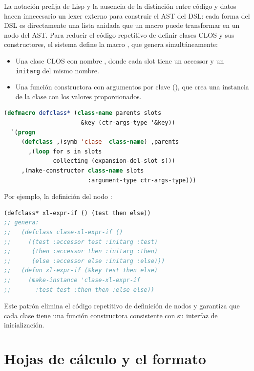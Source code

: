 La notación prefija de Lisp y la ausencia de la distinción entre código y
datos hacen innecesario un lexer externo para construir el AST del DSL: cada
forma del DSL es directamente una lista anidada que un macro puede transformar
en un nodo del AST.  Para reducir el código repetitivo de definir clases CLOS
y sus constructores, el sistema define la macro , que genera
simultáneamente:

\begin{itemize}
  \item Una clase CLOS con nombre , donde
    cada slot tiene un accessor y un \texttt{initarg} del mismo nombre.
  \item Una función constructora  con argumentos
    por clave (), que crea una instancia de la clase con los
    valores proporcionados.
\end{itemize}

\begin{lstlisting}[language=CommonLisp,
  caption={Implementaci\'on de defclass*.}]
(defmacro defclass* (class-name parents slots
                      &key (ctr-args-type '&key))
  `(progn
     (defclass ,(symb 'clase- class-name) ,parents
       ,(loop for s in slots
              collecting (expansion-del-slot s)))
     ,(make-constructor class-name slots
                        :argument-type ctr-args-type)))
\end{lstlisting}

Por ejemplo, la definición del nodo :

\begin{lstlisting}[language=CommonLisp,
  caption={Ejemplo de uso de defclass*.}]
(defclass* xl-expr-if () (test then else))
;; genera:
;;   (defclass clase-xl-expr-if ()
;;     ((test :accessor test :initarg :test)
;;      (then :accessor then :initarg :then)
;;      (else :accessor else :initarg :else)))
;;   (defun xl-expr-if (&key test then else)
;;     (make-instance 'clase-xl-expr-if
;;       :test test :then then :else else))
\end{lstlisting}

Este patrón elimina el código repetitivo de definición de nodos y garantiza
que cada clase tiene una función constructora consistente con su interfaz
de inicialización.

\section{Hojas de c\'alculo y el formato \xlsx{}}
\label{sec:hoja-calculo}

